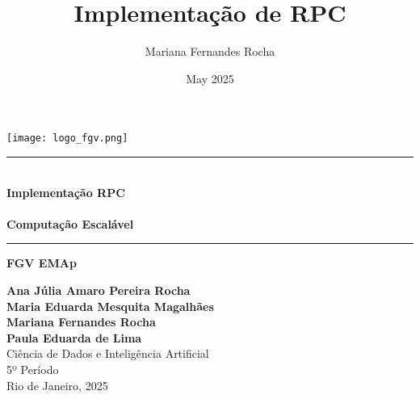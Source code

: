 \documentclass{article}
\title{Implementação de RPC}
\author{Mariana Fernandes Rocha}
\date{May 2025}
\begin{document}
\begin{titlepage}
    \begin{center}

        \vspace{1cm}
        \begin{minipage}{0.45\textwidth}
            \centering
            \texttt{[image: logo\_fgv.png]}    
        \end{minipage}
        \vspace{2cm}

        \rule{1\textwidth}{0.4pt} \\ %
        \vspace{0.3cm}
        {\Huge \textbf{Implementação RPC}} \\
        \vspace{0.2cm}
        \vspace{0.5cm}\\
        {\Large \textbf{Computação Escalável}}\\
        \rule{1\textwidth}{0.4pt} %


        \vspace{0.5cm}
        {\Large \textbf{FGV EMAp}} \\
        \vspace{2cm}
        
        

        
        
        
        {\large 
            \textbf{Ana Júlia Amaro Pereira Rocha} \\ 
            \textbf{Maria Eduarda Mesquita Magalhães}\\
            \textbf{Mariana Fernandes Rocha} \\
            \textbf{Paula Eduarda de Lima}}\\[1.5cm]
        
        {\large 
            Ciência de Dados e Inteligência Artificial \\ 
            5º Período}\\[2cm]
        
        \vfill
        {\large Rio de Janeiro, 2025}

        
    \end{center}
\end{titlepage}
\end{document}
